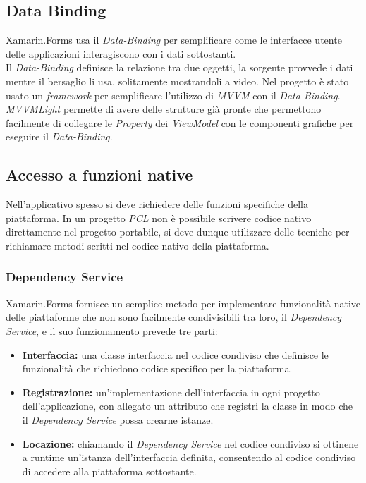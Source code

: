 \subsection{Data Binding}
Xamarin.Forms usa il \textit{Data-Binding} per semplificare come le interfacce utente delle applicazioni interagiscono con i dati sottostanti. 
\\
Il \textit{Data-Binding} definisce la relazione tra due oggetti, la sorgente provvede i dati mentre il bersaglio li usa, solitamente mostrandoli a video. Nel progetto è stato usato un \textit{framework} per semplificare l'utilizzo di \textit{MVVM} con il \textit{Data-Binding}. \textit{MVVMLight} permette di avere delle strutture già pronte che permettono facilmente di collegare le \textit{Property} dei \textit{ViewModel} con le componenti grafiche per eseguire il \textit{Data-Binding}.

\subsection{Accesso a funzioni native}
Nell'applicativo spesso si deve richiedere delle funzioni specifiche della piattaforma. In un progetto \textit{PCL} non è possibile scrivere codice nativo direttamente nel progetto portabile, si deve dunque utilizzare delle tecniche per richiamare metodi scritti nel codice nativo della piattaforma.
 
\subsubsection{Dependency Service}
Xamarin.Forms fornisce un semplice metodo per implementare funzionalità native delle piattaforme che non sono facilmente condivisibili tra loro, il \textit{Dependency Service}, e il suo funzionamento prevede tre parti:
\begin{itemize}
	\item \textbf{Interfaccia:} una classe interfaccia nel codice condiviso che definisce le funzionalità che richiedono codice specifico per la piattaforma.
	\item \textbf{Registrazione:} un'implementazione dell'interfaccia in ogni progetto dell'applicazione, con allegato un attributo che registri la classe in modo che il \textit{Dependency Service} possa crearne istanze.
	\item \textbf{Locazione:} chiamando il \textit{Dependency Service} nel codice condiviso si ottinene a runtime un'istanza dell'interfaccia definita, consentendo al codice condiviso di accedere alla piattaforma sottostante.
\end{itemize}

